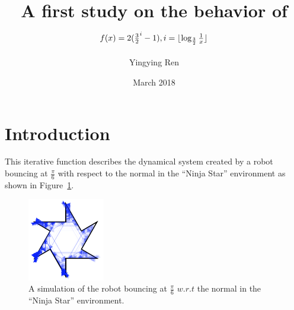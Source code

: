 \documentclass{article}
\title{A first study on the behavior of $f(x) = 2(\frac{3}{2}^{i}-1), i = \lfloor\log_{\frac{3}{2}}\frac{1}{x}\rfloor$}
\author{Yingying Ren}
\date{March 2018}
\theoremstyle{definition}
\theoremstyle{remark}
\begin{document}
\maketitle

\section{Introduction}
This iterative function describes the dynamical system created by a robot bouncing at $\frac{\pi}{6}$ with respect to the normal in the ``Ninja Star'' environment as shown in Figure~\ref{fig:hex_star}.
\begin{figure}[h]
\includegraphics[width=0.3\textwidth]{images/hex_star.jpeg}
\centering
\caption{A simulation of the robot bouncing at $\frac{\pi}{6}$ $w.r.t$ the normal in the ``Ninja Star'' environment.}\label{fig:hex_star}
\centering
\end{figure}
\end{document}
